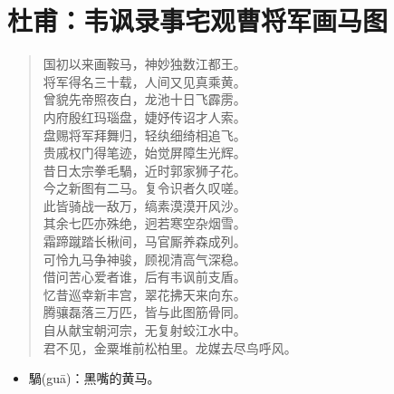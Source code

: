 \documentclass[12pt,oneside]{book}
\newenvironment{shici}{
\begin{verse}
\centering\large\hspace{12pt}}
{\end{verse}}
\begin{document}
\chapter{杜甫：韦讽录事宅观曹将军画马图}
\begin{shici}
国初以来画鞍马，神妙独数江都王。\\
将军得名三十载，人间又见真乘黄。\\
曾貌先帝照夜白，龙池十日飞霹雳。\\
内府殷红玛瑙盘，婕妤传诏才人索。\\
盘赐将军拜舞归，轻纨细绮相追飞。\\
贵戚权门得笔迹，始觉屏障生光辉。\\
昔日太宗拳毛騧，近时郭家狮子花。\\
今之新图有二马。复令识者久叹嗟。\\
此皆骑战一敌万，缟素漠漠开风沙。\\
其余七匹亦殊绝，迥若寒空杂烟雪。\\
霜蹄蹴踏长楸间，马官厮养森成列。\\
可怜九马争神骏，顾视清高气深稳。\\
借问苦心爱者谁，后有韦讽前支盾。\\
忆昔巡幸新丰宫，翠花拂天来向东。\\
腾骧磊落三万匹，皆与此图筋骨同。\\
自从献宝朝河宗，无复射蛟江水中。\\
君不见，金粟堆前松柏里。龙媒去尽鸟呼风。
\end{shici}

\begin{itemize}
\item 騧(guā)：黑嘴的黄马。
\end{itemize}
\end{document}
